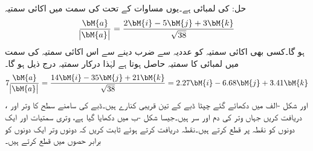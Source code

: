 حل: کی لمبائی  ہے۔یوں مساوات  کے تحت  کی سمت میں اکائی سمتیہ
\begin{align*}
\frac{\bM{a}}{\abs{\bM{a}}}=\frac{2\bM{i}-5\bM{j}+3\bM{k}}{\sqrt{38}}
\end{align*}
ہو گا۔کسی بھی اکائی سمتیہ کو عددیہ  سے ضرب دینے سے اس اکائی سمتیہ کی سمت میں  لمبائی کا سمتیہ حاصل ہوتا ہے لہٰذا درکار سمتیہ درج ذیل ہو گا۔
\begin{align*}
7\frac{\bM{a}}{\abs{\bM{a}}}=\frac{14\bM{i}-35\bM{j}+21\bM{k}}{\sqrt{38}}=2.27\bM{i}-6.68\bM{j}+3.41\bM{k}
\end{align*}
،  اور  شکل  -الف میں دکھائے گئے چپٹا  ڈبے کے تین قریبی کنارے ہیں۔ڈبے کی سامنے سطح  کا وتر  اور  دریافت کریں جہاں وتر  کی دم   اور سر  ہیں۔جیسا شکل  -ب میں دکھایا گیا ہے، وتری سمتیات  اور  ایک دونوں کو نقطہ  پر قطع کرتے ہیں۔نقطہ  دریافت کرتے ہوئے ثابت کریں کہ دونوں وتر ایک دونوں کو برابر حصوں میں قطع کرتے ہیں۔
